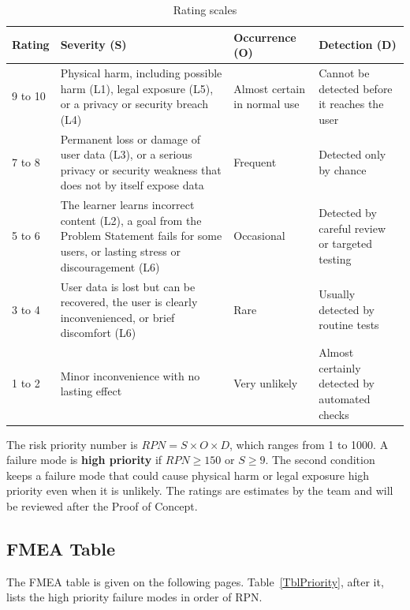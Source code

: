 \documentclass{article}
\begin{document}
\begin{table}[h!]
\caption{Rating scales} \label{TblScales}
\begin{tabularx}{\textwidth}{lXXX}
\toprule
\textbf{Rating} & \textbf{Severity (S)} & \textbf{Occurrence (O)} &
\textbf{Detection (D)}\\
\midrule
9 to 10 & Physical harm, including possible harm (L1), legal exposure (L5),
or a privacy or security breach (L4) & Almost certain in normal use & Cannot
be detected before it reaches the user\\
7 to 8 & Permanent loss or damage of user data (L3), or a serious privacy or
security weakness that does not by itself expose data & Frequent & Detected
only by chance\\
5 to 6 & The learner learns incorrect content (L2), a goal from the Problem
Statement fails for some users, or lasting stress or discouragement (L6) &
Occasional & Detected by careful review or targeted testing\\
3 to 4 & User data is lost but can be recovered, the user is clearly
inconvenienced, or brief discomfort (L6) & Rare & Usually detected by routine
tests\\
1 to 2 & Minor inconvenience with no lasting effect & Very unlikely & Almost
certainly detected by automated checks\\
\bottomrule
\end{tabularx}
\end{table}

The risk priority number is $\mathit{RPN} = S \times O \times D$, which ranges
from 1 to 1000. A failure mode is \textbf{high priority} if
$\mathit{RPN} \ge 150$ or $S \ge 9$. The second condition keeps a failure
mode that could cause physical harm or legal exposure high priority even when
it is unlikely. The ratings are estimates by the team and will be reviewed
after the Proof of Concept.

\subsection{FMEA Table}

The FMEA table is given on the following pages. Table~\ref{TblPriority}, after
it, lists the high priority failure modes in order of RPN.
\end{document}
